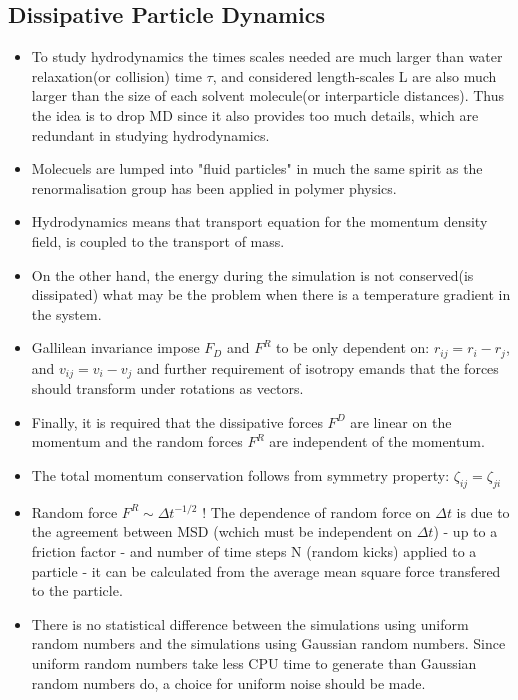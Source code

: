 \documentclass[10pt,a4paper]{article}
\begin{document}
\subsection{Dissipative Particle Dynamics \cite{ums:02,war:95, war:97}}
\begin{itemize}
 \item To study hydrodynamics the times scales needed are much larger than water relaxation(or collision) time $\tau$, 
 and considered length-scales L are also much larger than the size of each solvent molecule(or interparticle distances). 
 Thus the idea is to drop MD since it also provides too much details, which are redundant in studying hydrodynamics.
 \item Molecuels are lumped into "fluid particles" in much the same spirit as the renormalisation group has been applied in polymer physics.
 \item Hydrodynamics means that transport equation for the momentum density field, is coupled to the transport of mass.
 \item On the other hand, the energy during the simulation is not conserved(is dissipated) what may be the problem when
 there is a temperature gradient in the system.
 \item Gallilean invariance impose $F_D$ and $F^R$ to be only dependent on: $r_{ij} = r_i - r_j$, and $v_{ij} = v_{i} - v_{j}$
 and further requirement of isotropy emands that the forces should transform under rotations as vectors.
 \item Finally, it is required that the dissipative forces $F^D$ are linear on the momentum and the 
 random forces $F^R$ are independent of the momentum.
 \item The total momentum conservation follows from symmetry property: $\zeta_{ij} = \zeta_{ji}$
 \item Random force $F^R \sim \Delta t^{-1/2}$ ! The dependence of random force on $\Delta t$ is due to 
 the agreement between MSD (wchich must be independent on $\Delta t$) - up to a friction factor - and number of time steps N (random kicks) applied to a particle - it can be calculated from the
 average mean square force transfered to the particle.
 \item There is no statistical difference  between the simulations using uniform random numbers and the simulations using Gaussian random 
 numbers. Since uniform random numbers take less CPU time to generate than Gaussian random numbers do, a choice for uniform noise should be made.
 

\end{itemize}
\end{document}
